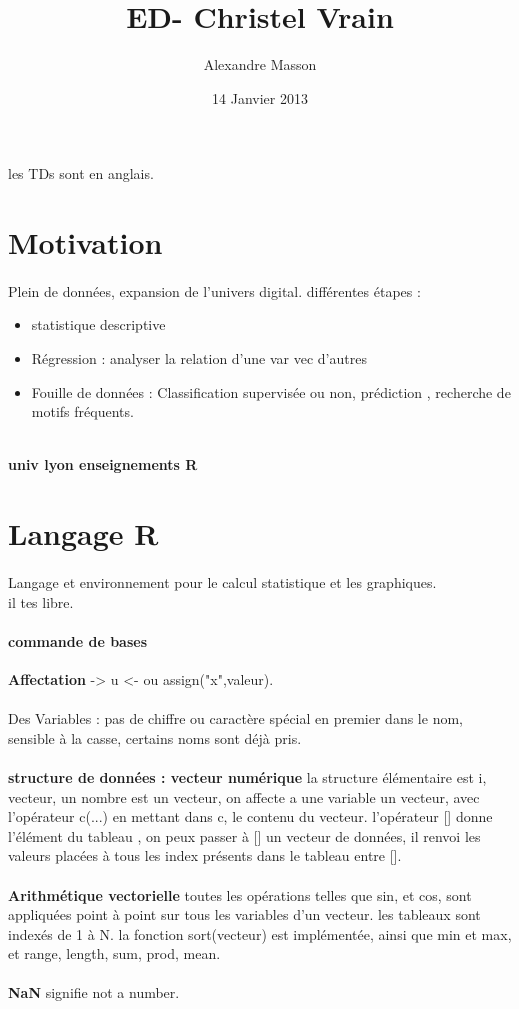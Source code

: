 \documentclass{article}
\title{ED- Christel Vrain}
\author{Alexandre Masson}
\date{14 Janvier 2013}
\begin{document}
\maketitle
\newpage
\tableofcontents
\newpage
\paragraph{} les TDs sont en anglais.
\section{Motivation}
\paragraph{}Plein de données, expansion de l'univers digital. différentes étapes : 
\begin{itemize}
\item statistique descriptive
\item Régression : analyser la relation d'une var vec d'autres
\item Fouille de données  : Classification supervisée ou non, prédiction , recherche de motifs fréquents.\\\\
\end{itemize}
\textbf{univ lyon enseignements R}
\newpage
\section{Langage R}
\paragraph{} Langage et environnement pour le calcul statistique et les graphiques.\\ il tes libre.

\paragraph{commande de bases}
\textbf{Affectation} -> u <- ou assign("x",valeur).\\\\Des Variables : pas de chiffre ou caractère spécial en premier dans le nom, sensible à la casse, certains noms sont déjà pris.\\\\\textbf{structure de données : vecteur numérique} la structure élémentaire est i, vecteur, un nombre est un vecteur, on affecte a une variable un vecteur, avec l'opérateur c(...) en mettant dans c, le contenu du vecteur. l'opérateur [] donne l'élément du tableau , on peux passer  à [] un vecteur de données, il renvoi les valeurs placées à tous les index présents dans le tableau entre [].\\\\\textbf{Arithmétique vectorielle} toutes les opérations telles que sin, et cos, sont appliquées point à point sur tous les variables d'un vecteur. les tableaux sont indexés de 1 à N. la fonction sort(vecteur) est implémentée, ainsi que min et max, et range, length, sum, prod, mean.\\\\\textbf{NaN}  signifie not a number.
\end{document}

